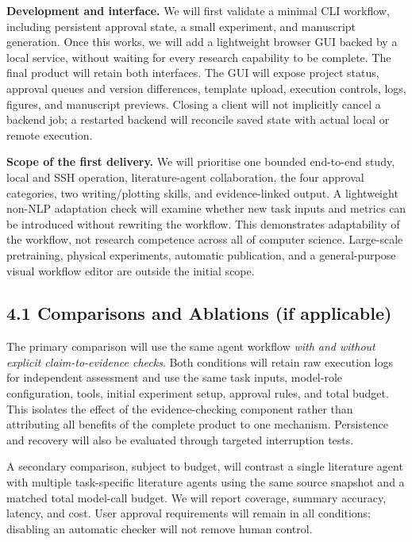 \documentclass[11pt]{article}
\begin{document}
\noindent\textbf{Development and interface.} We will first validate a minimal CLI workflow, including persistent approval state, a small experiment, and manuscript generation. Once this works, we will add a lightweight browser GUI backed by a local service, without waiting for every research capability to be complete. The final product will retain both interfaces. The GUI will expose project status, approval queues and version differences, template upload, execution controls, logs, figures, and manuscript previews. Closing a client will not implicitly cancel a backend job; a restarted backend will reconcile saved state with actual local or remote execution.

\noindent\textbf{Scope of the first delivery.} We will prioritise one bounded end-to-end study, local and SSH operation, literature-agent collaboration, the four approval categories, two writing/plotting skills, and evidence-linked output. A lightweight non-NLP adaptation check will examine whether new task inputs and metrics can be introduced without rewriting the workflow. This demonstrates adaptability of the workflow, not research competence across all of computer science. Large-scale pretraining, physical experiments, automatic publication, and a general-purpose visual workflow editor are outside the initial scope.

\subsection*{4.1 Comparisons and Ablations (if applicable)}

The primary comparison will use the same agent workflow \emph{with and without explicit claim-to-evidence checks}. Both conditions will retain raw execution logs for independent assessment and use the same task inputs, model-role configuration, tools, initial experiment setup, approval rules, and total budget. This isolates the effect of the evidence-checking component rather than attributing all benefits of the complete product to one mechanism. Persistence and recovery will also be evaluated through targeted interruption tests.

A secondary comparison, subject to budget, will contrast a single literature agent with multiple task-specific literature agents using the same source snapshot and a matched total model-call budget. We will report coverage, summary accuracy, latency, and cost. User approval requirements will remain in all conditions; disabling an automatic checker will not remove human control.
\end{document}
